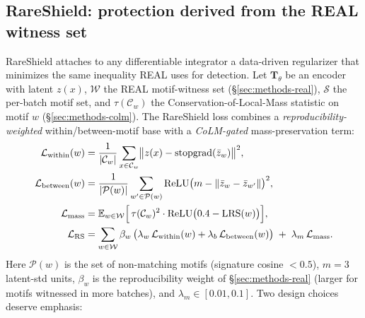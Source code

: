 
\subsection*{RareShield: protection derived from the REAL witness set}
\label{sec:rareshield-ml-unified}

RareShield attaches to any differentiable integrator a data-driven regularizer that minimizes the same inequality REAL uses for detection. Let $\mathbf{T}_\theta$ be an encoder with latent $z(x)$, $\mathcal{W}$ the REAL motif-witness set (\S\ref{sec:methods-real}), $\mathcal{S}$ the per-batch motif set, and $\tau(\mathcal{C}_w)$ the Conservation-of-Local-Mass statistic on motif $w$ (\S\ref{sec:methods-colm}). The RareShield loss combines a \emph{reproducibility-weighted} within/between-motif base with a \emph{CoLM-gated} mass-preservation term:
\begin{align*}
\mathcal{L}_\text{within}(w)  &= \frac{1}{|\mathcal{C}_w|}\sum_{x\in\mathcal{C}_w} \bigl\lVert z(x) - \operatorname{stopgrad}(\bar z_w)\bigr\rVert^2, \\
\mathcal{L}_\text{between}(w)  &= \frac{1}{|\mathcal{P}(w)|}\sum_{w'\in\mathcal{P}(w)} \operatorname{ReLU}\bigl(m - \lVert\bar z_w - \bar z_{w'}\rVert\bigr)^2, \\
\mathcal{L}_\text{mass}         &= \mathbb{E}_{w\in\mathcal{W}}\Bigl[\,\tau(\mathcal{C}_w)^2 \cdot \operatorname{ReLU}\bigl(0.4 - \mathrm{LRS}(w)\bigr)\Bigr], \\
\mathcal{L}_\text{RS}           &= \sum_{w\in\mathcal{W}} \beta_w\,\bigl(\lambda_w\,\mathcal{L}_\text{within}(w) + \lambda_b\,\mathcal{L}_\text{between}(w)\bigr) \;+\; \lambda_m\,\mathcal{L}_\text{mass}.
\end{align*}
Here $\mathcal{P}(w)$ is the set of non-matching motifs (signature cosine $<0.5$), $m=3$ latent-std units, $\beta_w$ is the reproducibility weight of \S\ref{sec:methods-real} (larger for motifs witnessed in more batches), and $\lambda_m\in[0.01, 0.1]$. Two design choices deserve emphasis:

